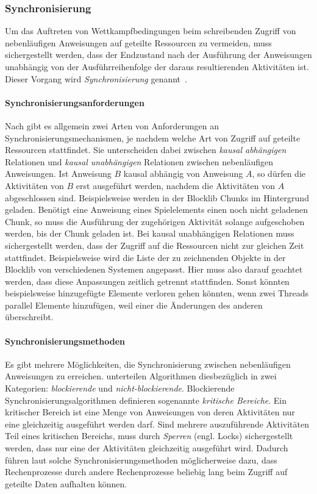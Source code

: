 \subsubsection{Synchronisierung}
Um das Auftreten von Wettkampfbedingungen beim schreibenden Zugriff von nebenläufigen Anweisungen auf geteilte Ressourcen zu vermeiden, muss sichergestellt werden, dass der Endzustand nach der Ausführung der Anweisungen unabhängig von der Ausführreihenfolge der daraus resultierenden Aktivitäten ist. Dieser Vorgang wird \emph{Synchronisierung} genannt~\cite[S.~4]{Maurer2019}.

\paragraph{Synchronisierungsanforderungen} Nach \textcite[S.~132~ff.]{Herrtwich1989} gibt es allgemein zwei Arten von Anforderungen an Synchronisierungsmechanismen, je nachdem welche Art von Zugriff auf geteilte Ressourcen stattfindet. Sie unterscheiden dabei zwischen \emph{kausal abhängigen} Relationen und \emph{kausal unabhängigen} Relationen zwischen nebenläufigen Anweisungen. Ist Anweisung $B$ kausal abhängig von Anweisung $A$, so dürfen die Aktivitäten von $B$ erst ausgeführt werden, nachdem die Aktivitäten von $A$ abgeschlossen sind. Beispielsweise werden in der Blocklib Chunks im Hintergrund geladen. Benötigt eine Anweisung eines Spielelements einen noch nicht geladenen Chunk, so muss die Ausführung der zugehörigen Aktivität solange aufgeschoben werden, bis der Chunk geladen ist. Bei kausal unabhängigen Relationen muss sichergestellt werden, dass der Zugriff auf die Ressourcen nicht zur gleichen Zeit stattfindet.  Beispielsweise wird die Liste der zu zeichnenden Objekte in der Blocklib von verschiedenen Systemen angepasst. Hier muss also darauf geachtet werden, dass diese Anpassungen zeitlich getrennt stattfinden. Sonst könnten beispielsweise hinzugefügte Elemente verloren gehen könnten, wenn zwei Threads parallel Elemente hinzufügen, weil einer die Änderungen des anderen überschreibt.

\paragraph{Synchronisierungsmethoden} Es gibt mehrere Möglichkeiten, die Synchronisierung zwischen nebenläufigen Anweisungen zu erreichen. \textcite{Michael1996} unterteilen Algorithmen diesbezüglich in zwei Kategorien: \emph{blockierende} und \emph{nicht-blockierende}. Blockierende Synchronisierungsalgorithmen definieren sogenannte \emph{kritische Bereiche}. Ein kritischer Bereich ist eine Menge von Anweisungen von deren Aktivitäten nur eine gleichzeitig ausgeführt werden darf. Sind mehrere auszuführende Aktivitäten Teil eines kritischen Bereichs, muss durch \emph{Sperren} (engl. Locks) sichergestellt werden, dass nur eine der Aktivitäten gleichzeitig ausgeführt wird. Dadurch führen laut \textcite{Michael1996} solche Synchronisierungsmethoden möglicherweise dazu, dass Rechenprozesse durch andere Rechenprozesse beliebig lang beim Zugriff auf geteilte Daten aufhalten können.

